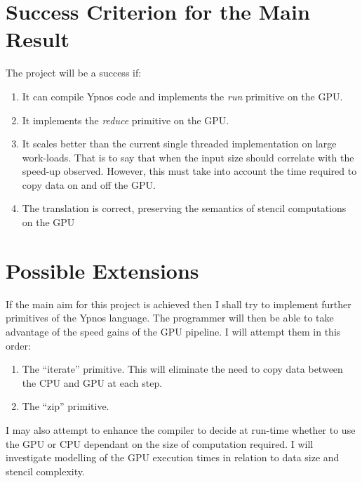 \section*{Success Criterion for the Main Result}

The project will be a success if:

\begin{enumerate}

\item It can compile Ypnos code and implements the \emph{run} primitive on the
GPU.

\item It implements the \emph{reduce} primitive on the GPU.

\item It scales better than the current single threaded implementation on large
work-loads. That is to say that when the input size should correlate with the
speed-up observed.  However, this must take into account the time required to
copy data on and off the GPU.

\item The translation is correct, preserving the semantics of stencil
computations on the GPU

\end{enumerate}

\section*{Possible Extensions}

If the main aim for this project is achieved then I shall try to implement
further primitives of the Ypnos language. The programmer will then be able to
take advantage of the speed gains of the GPU pipeline. I will attempt them in
this order:

\begin{enumerate}

\item The ``iterate'' primitive. This will eliminate the need to copy data
between the CPU and GPU at each step.

\item The ``zip'' primitive.

\end{enumerate}

I may also attempt to enhance the compiler to decide at run-time whether to use
the GPU or CPU dependant on the size of computation required. I will
investigate modelling of the GPU execution times in relation to data size and
stencil complexity.

